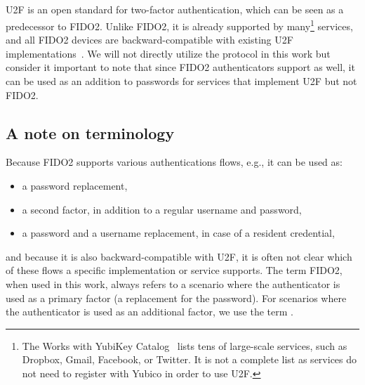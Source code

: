 \subsection{}\label{subsec:u2f}

U2F is an open standard for two-factor authentication, which can be seen as a predecessor to
FIDO2. Unlike FIDO2, it is already supported by many\footnote{The Works with YubiKey Catalog~\cite{yubico:works-with-u2f} lists tens of large-scale services, such as Dropbox, Gmail, Facebook, or Twitter. It is not a complete list as services do not need to register with Yubico in order to use U2F.}
services, and all FIDO2 devices are backward-compatible with
existing U2F implementations~\cite{yubico:u2f}. We will not directly utilize the  protocol in this work but consider it
important to note that since FIDO2 authenticators support  as well, it can be used as an addition to passwords
for services that implement U2F but not FIDO2.

\subsection{A note on terminology}\label{subsec:a-note-on-terminology}

Because FIDO2 supports various authentications flows, e.g., it can be used as:

\begin{itemize}
	\item a password replacement,
	\item a second factor, in addition to a regular username and password,
	\item a password and a username replacement, in case of a resident credential,
\end{itemize}

and because it is also backward-compatible with U2F, it is often not clear which of these flows
a specific implementation or service supports. The term FIDO2, when used in this work, always refers
to a scenario where the authenticator is used as a primary factor (a replacement for the password).
For scenarios where the authenticator is used as an additional factor, we use the term .
